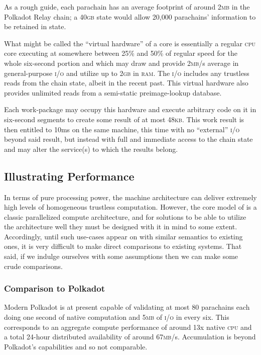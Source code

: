 As a rough guide, each parachain has an average footprint of around 2\textsc{mb} in the Polkadot Relay chain; a 40\textsc{gb} state would allow 20,000 parachains' information to be retained in state.

What might be called the ``virtual hardware'' of a \Jam core is essentially a regular \textsc{cpu} core executing at somewhere between 25\% and 50\% of regular speed for the whole six-second portion and which may draw and provide 2\textsc{mb}/s average in general-purpose \textsc{i/o} and utilize up to 2\textsc{gb} in \textsc{ram}. The \textsc{i/o} includes any trustless reads from the \Jam chain state, albeit in the recent past. This virtual hardware also provides unlimited reads from a semi-static preimage-lookup database.

Each work-package may occupy this hardware and execute arbitrary code on it in six-second segments to create some result of at most 48\textsc{kb}. This work result is then entitled to 10ms on the same machine, this time with no ``external'' \textsc{i/o} beyond said result, but instead with full and immediate access to the \Jam chain state and may alter the service(s) to which the results belong.

\subsection{Illustrating Performance}

In terms of pure processing power, the \Jam machine architecture can deliver extremely high levels of homogeneous trustless computation. However, the core model of \Jam is a classic parallelized compute architecture, and for solutions to be able to utilize the architecture well they must be designed with it in mind to some extent. Accordingly, until such use-cases appear on \Jam with similar semantics to existing ones, it is very difficult to make direct comparisons to existing systems. That said, if we indulge ourselves with some assumptions then we can make some crude comparisons.

\subsubsection{Comparison to Polkadot}
Modern Polkadot is at present capable of validating at most 80 parachains each doing one second of native computation and 5\textsc{mb} of \textsc{i/o} in every six. This corresponds to an aggregate compute performance of around 13x native \textsc{cpu} and a total 24-hour distributed availability of around 67\textsc{mb}/s. Accumulation is beyond Polkadot's capabilities and so not comparable.

